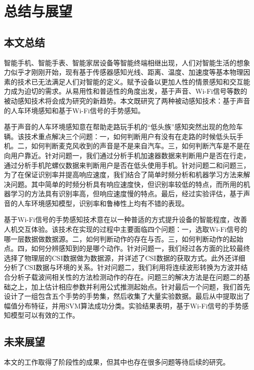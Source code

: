 \chapter{总结与展望}

\section{本文总结}
智能手机、智能手表、智能家居设备等智能终端相继出现，人们对智能生活的想象力似乎才刚刚开始，现有基于传感器感知光线、距离、温度、加速度等基本物理因素的技术已无法满足人们对智能的定义。赋予设备以更加人性的情景感知和交互能力成为迫切的需求。从易用性和普适性的角度出发，基于声音、Wi-Fi信号等数的被动感知技术将会成为研究的新趋势。本文既研究了两种被动感知技术：基于声音的人车环境感知和基于Wi-Fi信号的手势感知。

基于声音的人车环境感知意在帮助走路玩手机的“低头族”感知突然出现的危险车辆。该技术重点解决三个问题：一，如何判断用户有没有在走路的时候低头玩手机。二，如何判断麦克风收到的声音是不是来自汽车。三，如何判断汽车是不是在向用户靠近。针对问题一，我们通过分析手机加速器数据来判断用户是否在行走，通过分析手机陀螺仪数据来判断用户是否在低头使用手机。针对问题二和问题三，为了在保证识别率并提高响应速度，我们结合了简单时频分析和机器学习方法来解决问题。其中简单的时频分析具有响应速度快，但识别率较低的特点，而所用的机器学习的方法具有识别率高，但响应速度慢的特点。最后，经过实验评估，基于声音的人车环境感知模型，识别率和鲁棒性上均有不错的表现。

基于Wi-Fi信号的手势感知技术意在以一种普适的方式提升设备的智能程度，改善人机交互体验。该技术在实现的过程中主要面临四个问题：一，选取Wi-Fi信号的哪一层数据做数据源。二，如何判断动作的存在与否。三，如何判断动作的起始点。四，如何分辨感知到的是哪个动作。针对问题一，我们经过各方面的比较最终选择了物理层的CSI数据做为数据源，并详述了CSI数据的获取方式。此外还详细分析了CSI数据与环境的关系。针对问题二，我们利用将连续波形转换为方波并结合分析子载波间相关性的方法检测动作的存在。问题三的解决方法是在问题二的基础之上，加上估计相应参数并利用公式推测起始点。针对最后一个问题，我们首先设计了一组包含五个手势的手势集，然后收集了大量实验数据。最后从中提取出了幅值分布特征，并用SVM算法成功分类。实验结果表明，基于Wi-Fi信号的手势感知模型可以有效的工作。


\section{未来展望}

本文的工作取得了阶段性的成果，但其中也存在很多问题等待后续的研究。

